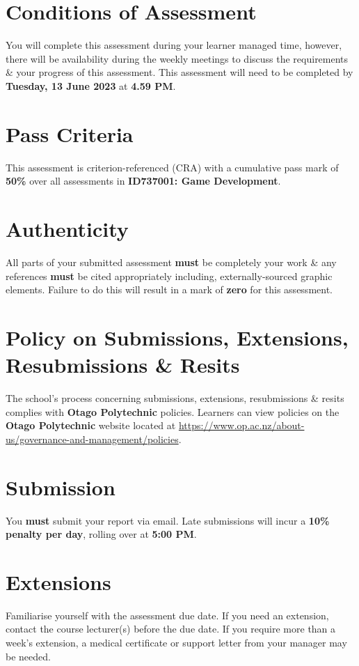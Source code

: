 \documentclass{article}
\begin{document}
\section*{Conditions of Assessment}
You will complete this assessment during your learner managed time, however, there will be availability during the weekly meetings to discuss the requirements \& your progress of this assessment. This assessment will need to be completed by \textbf{Tuesday, 13 June 2023} at \textbf{4.59 PM}.

\section*{Pass Criteria}
This assessment is criterion-referenced (CRA) with a cumulative pass mark of \textbf{50\%} over all assessments in \textbf{ID737001: Game Development}.

\section*{Authenticity}
All parts of your submitted assessment \textbf{must} be completely your work \& any references \textbf{must} be cited appropriately including, externally-sourced graphic elements. Failure to do this will result in a mark of \textbf{zero} for this assessment.

\section*{Policy on Submissions, Extensions, Resubmissions \& Resits}
The school's process concerning submissions, extensions, resubmissions \& resits complies with \textbf{Otago Polytechnic} policies. Learners can view policies on the \textbf{Otago Polytechnic} website located at \href{https://www.op.ac.nz/about-us/governance-and-management/policies}{https://www.op.ac.nz/about-us/governance-and-management/policies}.

\section*{Submission}
You \textbf{must} submit your report via email. Late submissions will incur a \textbf{10\% penalty per day}, rolling over at \textbf{5:00 PM}.

\section*{Extensions}
Familiarise yourself with the assessment due date. If you need an extension, contact the course lecturer(s) before the due date. If you require more than a week's extension, a medical certificate or support letter from your manager may be needed.
\end{document}

